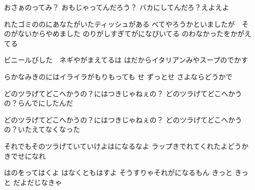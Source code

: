 \documentclass{article}
\newenvironment{Japanese}{%
\CJKfamily{min}%
\CJKtilde
\CJKnospace}{}
\begin{document}
\begin{CJK}{UTF8}{}
\begin{Japanese}
\begin{songs}{}
おさぁのってみ？
おもじゃってんだろう？
バカにしてんだろ？えよえよ

れたゴミののにあなたがいたティッシュがある
べてやろうかといましたが　そのがないからやめました
のりがしすぎてがになびいてる
のわなかったをかがえてる

ビニールびした　ネギやがまえてるは
はだからイタリアンみやスープのでかす

らかなみきのにはイライラがもりもっても
せ
ずっとせ
さよならどうかで

どのツラげてどこへかうの？にはつきじゃねぇの？
どのツラげてどこへかうの？らんでにしたんだ

どのツラげてどこへかうの？にはつきじゃねぇの？
どのツラげてどこへかうの？いたえてなくなった

それでもそのツラげていていけよはになるなよ
ラップきでれてくれたよどうかきでせになれ

はのをってはくよ
はなくともはすよ
そうすりゃそれがになるもん
きっと きっと だよだじなきゃ


\end{songs}
\end{Japanese}
\end{CJK}
\end{document}
